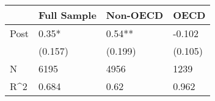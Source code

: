 \begin{tabular}{llll}
\toprule
     & Full Sample & Non-OECD &    OECD \\
\midrule
Post &       0.35* &   0.54** &  -0.102 \\
     &     (0.157) &  (0.199) & (0.105) \\
   N &        6195 &     4956 &    1239 \\
 R\textasciicircum 2 &       0.684 &     0.62 &   0.962 \\
\bottomrule
\end{tabular}
